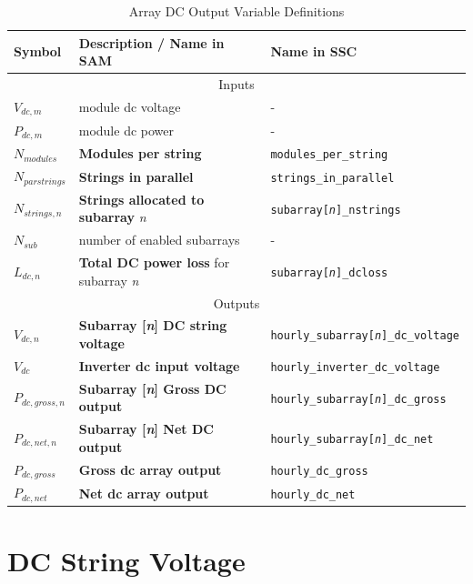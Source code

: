 \documentclass[12pt,letterpaper]{article}
\begin{document}
\begin{table}
\begin{center}
\caption{Array DC Output Variable Definitions}
\begin{tabular}{lll}
\midrule
Symbol & Description / \textbf{Name in SAM} & Name in SSC \\
\midrule
\multicolumn{3}{c}{Inputs}\\
$V_{dc,m}$ & module dc voltage & - \\
$P_{dc,m}$ & module dc power & - \\
$N_{modules}$ & \textbf{Modules per string} & \texttt{modules\_per\_string} \\
$N_{parstrings}$ & \textbf{Strings in parallel} & \texttt{strings\_in\_parallel} \\
$N_{strings,n}$ & \textbf{Strings allocated to subarray} \textit{n} & \texttt{subarray[\textit{n}]\_nstrings} \\
$N_{sub}$ & number of enabled subarrays & - \\
$L_{dc,n}$ & \textbf{Total DC power loss} for subarray \textit{n} &  \texttt{subarray[\textit{n}]\_dcloss} \\
\midrule
\multicolumn{3}{c}{Outputs}\\
$V_{dc,n}$ & \textbf{Subarray [\textit{n}] DC string voltage} & \texttt{hourly\_subarray[\textit{n}]\_dc\_voltage} \\
$V_{dc}$ & \textbf{Inverter dc input voltage} & \texttt{hourly\_inverter\_dc\_voltage} \\
$P_{dc,gross,n}$ & \textbf{Subarray [\textit{n}] Gross DC output} &  \texttt{hourly\_subarray[\textit{n}]\_dc\_gross} \\
$P_{dc,net,n}$ & \textbf{Subarray [\textit{n}] Net DC output} &  \texttt{hourly\_subarray[\textit{n}]\_dc\_net} \\
$P_{dc,gross}$ & \textbf{Gross dc array output} & \texttt{hourly\_dc\_gross} \\
$P_{dc,net}$ & \textbf{Net dc array output} & \texttt{hourly\_dc\_net} \\
\hline
\end{tabular}
\label{tab-arraydcoutputvars}
\end{center}
\end{table}

\section{DC String Voltage}\label{sec-dcstringvoltage}
\end{document}
